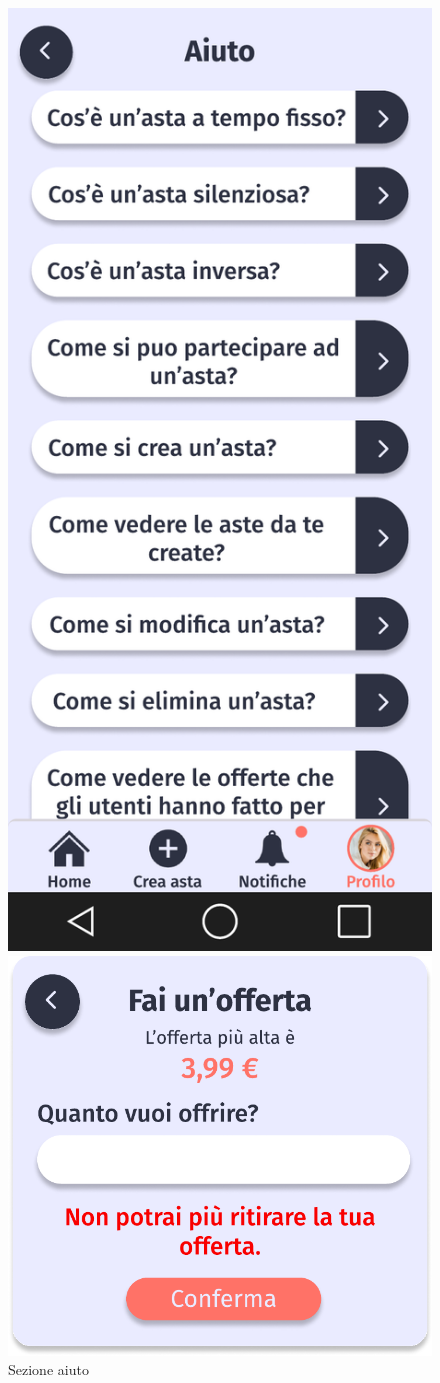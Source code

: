     \begin{figure}[!htb]
        \begin{minipage}{0.32\textwidth}
            \centering
            \includegraphics[width=.7\linewidth]{Immagini/Frames/Compratore/C18.pdf}
            \caption{Sezione aiuto}
        \end{minipage}\hfill
        \begin{minipage}{0.32\textwidth}
            \centering
            \includegraphics[width=.7\linewidth]{Immagini/Frames/Popup/P1.pdf}

\end{minipage}
\end{figure}
